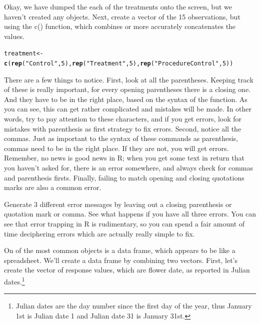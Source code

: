 \documentclass{tufte-handout}\usepackage[]{graphicx}\usepackage[]{xcolor}
\makeatletter
\newcommand{\hlnum}[1]{\textcolor[rgb]{0.686,0.059,0.569}{#1}}%
\newcommand{\hlstr}[1]{\textcolor[rgb]{0.192,0.494,0.8}{#1}}%
\newcommand{\hlstd}[1]{\textcolor[rgb]{0.345,0.345,0.345}{#1}}%
\newcommand{\hlkwb}[1]{\textcolor[rgb]{0.69,0.353,0.396}{#1}}%
\newcommand{\hlkwd}[1]{\textcolor[rgb]{0.737,0.353,0.396}{\textbf{#1}}}%
\newenvironment{kframe}{%
 \def\at@end@of@kframe{}%
 \ifinner\ifhmode%
  \def\at@end@of@kframe{\end{minipage}}%
  \begin{minipage}{\columnwidth}%
 \fi\fi%
 \def\FrameCommand##1{\hskip\@totalleftmargin \hskip-\fboxsep
 \colorbox{shadecolor}{##1}\hskip-\fboxsep
     \hskip-\linewidth \hskip-\@totalleftmargin \hskip\columnwidth}%
 \MakeFramed {\advance\hsize-\width
   \@totalleftmargin\z@ \linewidth\hsize
   \@setminipage}}%
 {\par\unskip\endMakeFramed%
 \at@end@of@kframe}
\newenvironment{knitrout}{}{} %
\makeatother
\begin{document}
Okay, we have dumped the each of the treatments onto the screen, but we haven't created any objects. Next, create a vector of the 15 observations, but using the c() function, which combines or more accurately concatenates the values. 

\begin{knitrout}
\color{fgcolor}\begin{kframe}
\begin{alltt}
\hlstd{treatment} \hlkwb{<-} \hlkwd{c}\hlstd{(}\hlkwd{rep}\hlstd{(}\hlstr{"Control"}\hlstd{,} \hlnum{5}\hlstd{),} \hlkwd{rep}\hlstd{(}\hlstr{"Treatment"}\hlstd{,} \hlnum{5}\hlstd{),} \hlkwd{rep}\hlstd{(}\hlstr{"Procedure Control"}\hlstd{,} \hlnum{5}\hlstd{))}
\end{alltt}
\end{kframe}
\end{knitrout}

There are a few things to notice. First, look at all the parentheses. Keeping track of these is really important, for every opening parentheses there is a closing one. And they have to be in the right place, based on the syntax of the function. As you can see, this can get rather complicated and mistakes will be made. In other words, try to pay attention to these characters, and if you get errors, look for mistakes with parenthesis as first strategy to fix errors. Second, notice all the commas. Just as important to the syntax of these commands as parenthesis, commas need to be in the right place. If they are not, you will get errors. Remember, no news is good news in R; when you get some text in return that you haven't asked for, there is an error somewhere, and always check for commas and parenthesis firsts. Finally, failing to match opening and closing quotations marks are also a common error. 

Generate 3 different error messages by leaving out a closing parenthesis or quotation mark or comma. See what happens if you have all three errors. You can see that error trapping in R is rudimentary, so you can spend a fair amount of time deciphering errors which are actually really simple to fix. 

On of the most common objects is a data frame, which appears to be like a spreadsheet. We'll create a data frame by combining two vectors. First, let's create the vector of response values, which are flower date, as reported in Julian dates.\footnote[][-1.1cm]{Julian dates are the day number since the first day of the year, thus January 1st is Julian date 1 and Julian date 31 is January 31st.}
\end{document}
